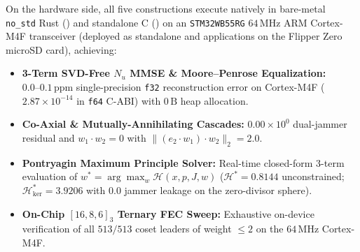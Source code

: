 \documentclass[journal,twoside]{IEEEtran}
\theoremstyle{definition}
\theoremstyle{remark}
\begin{document}
On the hardware side, all five constructions execute natively in bare-metal \texttt{no\_std} Rust () and standalone C () on an \texttt{STM32WB55RG} $64\,\mathrm{MHz}$ ARM Cortex-M4F transceiver (deployed as standalone  and  applications on the Flipper Zero microSD card), achieving:
\begin{itemize}
    \item \textbf{3-Term SVD-Free $N_u$ MMSE \& Moore--Penrose Equalization:} $0.0\text{--}0.1\,\mathrm{ppm}$ single-precision \texttt{f32} reconstruction error on Cortex-M4F ($2.87 \times 10^{-14}$ in \texttt{f64} C-ABI) with $0\,\mathrm{B}$ heap allocation.
    \item \textbf{Co-Axial \& Mutually-Annihilating Cascades:} $0.00 \times 10^0$ dual-jammer residual and $w_1 \cdot w_2 = 0$ with $\| (e_2 \cdot w_1)\cdot w_2 \|_2 = 2.0$.
    \item \textbf{Pontryagin Maximum Principle Solver:} Real-time closed-form 3-term evaluation of $w^* = \arg\max_w \mathcal{H}(x, p, J, w)$ ($\mathcal{H}^* = 0.8144$ unconstrained; $\mathcal{H}^*_{\ker} = 3.9206$ with $0.0$ jammer leakage on the zero-divisor sphere).
    \item \textbf{On-Chip $[16, 8, 6]_3$ Ternary FEC Sweep:} Exhaustive on-device verification of all $513 / 513$ coset leaders of weight $\le 2$ on the $64\,\mathrm{MHz}$ Cortex-M4F.
\end{itemize}
\end{document}
